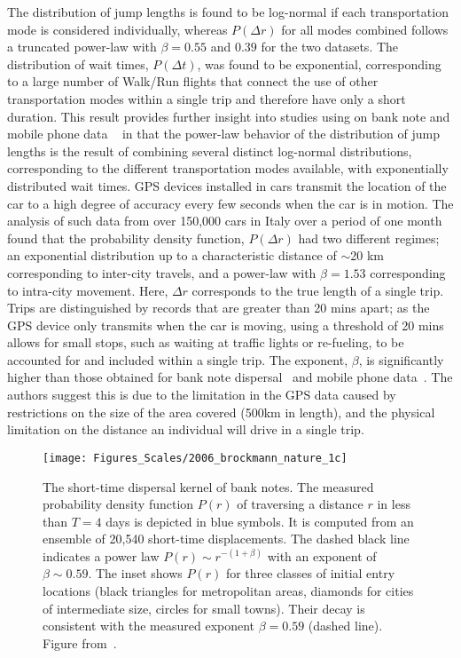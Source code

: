 The distribution of jump lengths is found to be log-normal if each transportation mode is considered individually, whereas $P(\Delta r)$ for all modes combined follows a truncated power-law with $\beta = 0.55$ and $0.39$  for the two datasets. The distribution of wait times, $P(\Delta t)$, was found to be exponential, corresponding to a large number of Walk/Run flights that connect the use of other transportation modes within a single trip and therefore have only a short duration. This result provides further insight into studies using on bank note and mobile phone data ~\cite{brockmann_2006_scaling, gonzalez_2008_understanding, song_2010_modelling} in that the power-law behavior of the distribution of jump lengths is the result of combining several distinct log-normal distributions, corresponding to the different transportation modes available, with exponentially distributed wait times. 
GPS devices installed in cars transmit the location of the car to a high degree of accuracy every few seconds when the car is in motion. The analysis of such data from over 150,000 cars in Italy over a period of one month~\cite{pappalardo_2013_understanding} found that the probability density function, $P(\Delta r)$ had two different regimes; an exponential distribution up to a characteristic distance of $\sim$20 km corresponding to inter-city travels, and a power-law with $\beta=1.53$ corresponding to intra-city movement.  Here, $\Delta r$ corresponds to the true length of a single trip. Trips are distinguished by records that are greater than 20 mins apart; as the GPS device only transmits when the car is moving, using a threshold of 20 mins allows for small stops, such as waiting at traffic lights or re-fueling, to be accounted for and included within a single trip.
The exponent, $\beta$, is significantly higher than those obtained for bank note dispersal~\cite{brockmann_2006_scaling} and mobile phone data~\cite{gonzalez_2008_understanding, song_2010_modelling}. The authors suggest this is due to the limitation in the GPS data caused by restrictions on the size of the area covered (500km in length), and the physical limitation on the distance an individual will drive in a single trip.


\begin{figure}[t!]
\centering
\texttt{[image: Figures\_Scales/2006\_brockmann\_nature\_1c]}
\caption{The short-time dispersal kernel of bank notes. The measured probability density function $P(r)$ of traversing a distance $r$ in less than $T = 4$ days is depicted in blue symbols. It is computed from an ensemble of 20,540 short-time displacements. The dashed black line indicates a power law $P(r)\sim r^{-(1+ \beta)}$ with an exponent of $\beta \sim 0.59$. The inset shows $P(r)$ for three classes of initial entry locations (black triangles for metropolitan areas, diamonds for cities of intermediate size, circles for small towns). Their decay is consistent with the measured exponent $\beta = 0.59$ (dashed line). Figure from~\cite{brockmann_2006_scaling}.}
\label{fig:scales_brockmann_1c}
\end{figure}




